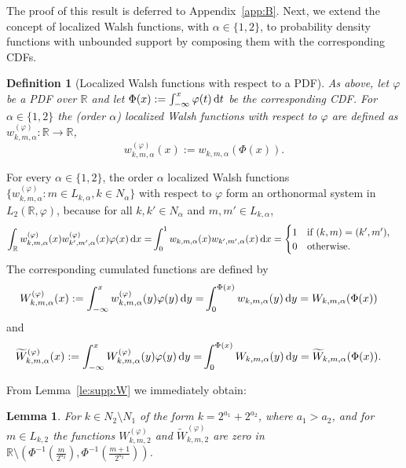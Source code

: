 \documentclass[namedate,webpdf,imanum]{ima-authoring-arxiv}%
\theoremstyle{thmstyletwo}%
\newtheorem{lemma}{Lemma}
\newtheorem{definition}{Definition}
\numberwithin{equation}{section}
\newcommand{\rd}{\, {\rm d}}
\newcommand{\RR}{\mathbb{R}}
\begin{document}
The proof of this result is deferred to Appendix~\ref{app:B}. Next, we extend the concept of localized Walsh functions, with $\alpha \in \{1,2\}$, to probability density functions with unbounded support by composing them with the corresponding CDFs.



\begin{definition}[Localized Walsh functions with respect to a PDF]
As above, let $\varphi$ be a PDF over $\mathbb{R}$ and let $\Phi(x):=\int_{-\infty}^x \varphi(t) \rd t$ be the corresponding CDF. For $\alpha \in \{1,2\}$ the {\it (order $\alpha$) localized Walsh functions with respect to $\varphi$} are defined as $w_{k,m,\alpha}^{(\varphi)}: \RR \rightarrow \RR$, 
\begin{equation*}
w_{k,m,\alpha}^{(\varphi)}(x) := w_{k,m,\alpha}(\Phi(x)).
\end{equation*}
\end{definition}

For every $\alpha \in \{1, 2\}$, the order $\alpha$ localized Walsh functions $\{w_{k,m,\alpha}^{(\varphi)}: m \in L_{k,\alpha}, k \in N_{\alpha}\}$ with respect to $\varphi$ form an orthonormal system in $L_2(\RR,\varphi)$, because for all $k, k' \in N_\alpha$ and $m, m' \in L_{k,\alpha}$,
\begin{align*}
\int_{\mathbb{R}} w_{k,m,\alpha}^{(\varphi)}(x) w_{k',m',\alpha}^{(\varphi)}(x) \varphi(x) \rd x = & \int_{0}^1 w_{k,m,\alpha}(x) w_{k',m',\alpha}(x) \rd x= \begin{cases} 1 & \mbox{if } (k,m) = (k', m'), \\ 0 & \mbox{otherwise}. \end{cases}
\end{align*}
The corresponding cumulated functions are defined by
\begin{align}\label{cum:Wphi1}
W_{k,m,\alpha}^{(\varphi)}(x)  :=  \int_{-\infty}^x w_{k,m,\alpha}^{(\varphi)}(y) \varphi(y) \rd y = & \int_0^{\Phi(x)} w_{k,m,\alpha}(y) \rd y = W_{k,m,\alpha}(\Phi(x))
\end{align}
and
\begin{align}\label{cum:Wphi2}
\widetilde{W}_{k,m,\alpha}^{(\varphi)}(x)  :=  \int_{-\infty}^x W_{k,m,\alpha}^{(\varphi)}(y) \varphi(y) \rd y = & \int_0^{\Phi(x)} W_{k,m,\alpha}(y) \rd y = \widetilde{W}_{k,m,\alpha}(\Phi(x)).
\end{align}


From Lemma~\ref{le:supp:W} we immediately obtain:

\begin{lemma}\label{le:supp:WW}
For $k \in N_2\setminus N_1$ of the form $k=2^{a_1}+2^{a_2}$, where $a_1>a_2$, and for $m \in L_{k,2}$ the functions $W_{k,m,2}^{(\varphi)}$ and $\widetilde{W}_{k,m,2}^{(\varphi)}$ are zero in $\mathbb{R}\setminus (\Phi^{-1}(\frac{m}{2^{a_2}}),\Phi^{-1}(\frac{m+1}{2^{a_2}}))$.  
\end{lemma}
\end{document}

